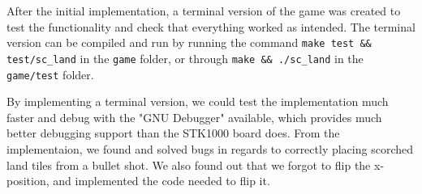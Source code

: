 After the initial implementation, a terminal version of the game was
created to test the functionality and check that everything worked as intended.
The terminal version can be compiled and run by running the command 
\verb|make test && test/sc_land| in the \texttt{game} folder, or
through \verb|make && ./sc_land| in the \texttt{game/test} folder.



By implementing a terminal version, we could test the implementation
much faster and debug with the "GNU Debugger" available, which provides 
much better debugging support than the STK1000 board does. From the
implementaion, we found and solved bugs in regards to correctly placing
scorched land tiles from a bullet shot. We also found out that we forgot to
flip the x-position, and implemented the code needed to flip it.

